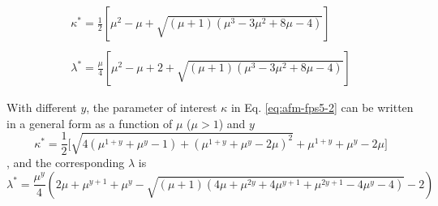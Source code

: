 \begin{equation}
\begin{array}{l}
\displaystyle \kappa^* = \frac{1}{2}\left[\mu^2 -\mu + \sqrt{(\mu+1)(\mu^3 - 3\mu^2 +8\mu-4)} \right]  \\  \\
\displaystyle \lambda^* = \frac{\mu}{4}\left[\mu^2 -\mu+2 + \sqrt{(\mu+1)(\mu^3 - 3\mu^2 +8\mu-4)} \right]
\end{array} 
\label{eq:afm-fps5-2}
\end{equation}

With different $y$,  the parameter of interest $\kappa$ in Eq. \ref{eq:afm-fps5-2} can be written in a general form as a function of $\mu$ ($\mu>1$) and $y$
\begin{equation}
\kappa^* = \frac{1}{2}\Big[\sqrt{4\left( \mu^{1+y} + \mu^{y} - 1\right)+\left( \mu^{1+y} + \mu^{y} - 2\mu\right)^2}+ 
\mu^{1+y}+\mu^{y} -2\mu \Big] 
\label{eq:afm-fyps_k}
\end{equation}
, and the corresponding $\lambda$ is
\begin{equation}
\lambda^* = \frac{\mu ^y}{4}  \left(2 \mu +\mu ^{y+1}+\mu ^y-\sqrt{(\mu +1) \left(4 \mu +\mu ^{2 y}+4 \mu ^{y+1}+\mu ^{2 y+1}-4 \mu ^y-4\right)}-2\right)
\label{eq:afm-fyps_l}
\end{equation}

